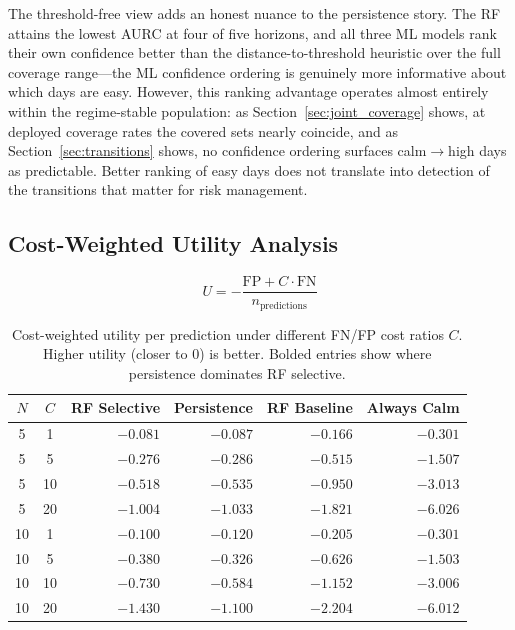 \documentclass[12pt]{article}
\begin{document}
The threshold-free view adds an honest nuance to the persistence story. The RF attains the
lowest AURC at four of five horizons, and all three ML models rank their own confidence better
than the distance-to-threshold heuristic over the full coverage range---the ML confidence
ordering is genuinely more informative about which days are easy. However, this ranking
advantage operates almost entirely within the regime-stable population: as
Section~\ref{sec:joint_coverage} shows, at deployed coverage rates the covered sets nearly
coincide, and as Section~\ref{sec:transitions} shows, no confidence ordering surfaces
calm$\to$high days as predictable. Better ranking of easy days does not translate into
detection of the transitions that matter for risk management.

\subsection{Cost-Weighted Utility Analysis}
\label{sec:utility}

\begin{equation}
    U = -\frac{\text{FP} + C \cdot \text{FN}}{n_{\text{predictions}}}
    \label{eq:utility}
\end{equation}

\begin{table}[H]
\centering
\caption{Cost-weighted utility per prediction under different FN/FP cost ratios $C$. Higher
utility (closer to 0) is better. Bolded entries show where persistence dominates RF selective.}
\label{tab:utility}
\begin{tabular}{ccrrrr}
\toprule
$N$ & $C$ & RF Selective & Persistence & RF Baseline & Always Calm \\
\midrule
5 &  1 & $-0.081$ & $-0.087$ & $-0.166$ & $-0.301$ \\
5 &  5 & $-0.276$ & $-0.286$ & $-0.515$ & $-1.507$ \\
5 & 10 & $-0.518$ & $-0.535$ & $-0.950$ & $-3.013$ \\
5 & 20 & $-1.004$ & $-1.033$ & $-1.821$ & $-6.026$ \\
\midrule
10 &  1 & $-0.100$ & $-0.120$ & $-0.205$ & $-0.301$ \\
10 &  5 & $-0.380$ & $\mathbf{-0.326}$ & $-0.626$ & $-1.503$ \\
10 & 10 & $-0.730$ & $\mathbf{-0.584}$ & $-1.152$ & $-3.006$ \\
10 & 20 & $-1.430$ & $\mathbf{-1.100}$ & $-2.204$ & $-6.012$ \\
\bottomrule
\end{tabular}
\end{table}
\end{document}
